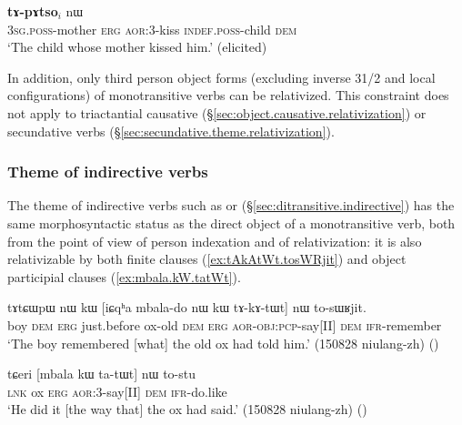 \begin{exe}
\ex \label{ex:Wmu.kW.kanWpoR}
\gll [ɯ$_i$-mu kɯ ka-nɯpoʁ] \textbf{tɤ-pɤtso}$_i$ nɯ \\
\textsc{3sg}.\textsc{poss}-mother \textsc{erg} \textsc{aor}:3\flobv{}-kiss \textsc{indef}.\textsc{poss}-child \textsc{dem} \\
\glt `The child whose mother kissed him.' (elicited)
\end{exe}

In addition, only third person object forms (excluding inverse 3\fl{}1/2 and local configurations) of monotransitive verbs can be relativized. This constraint does not apply to triactantial causative (§\ref{sec:object.causative.relativization}) or secundative verbs (§\ref{sec:secundative.theme.relativization}).
\subsubsection{Theme of indirective verbs} \label{sec:indirective.relativization}
The theme of indirective verbs such as  or  (§\ref{sec:ditransitive.indirective}) has the same morphosyntactic status as the direct object of a monotransitive verb, both from the point of view of person indexation and of relativization: it is also relativizable by both finite clauses (\ref{ex:tAkAtWt.tosWRjit}) and object participial clauses (\ref{ex:mbala.kW.tatWt}).

\begin{exe}
\ex \label{ex:tAkAtWt.tosWRjit}
\gll tɤtɕɯpɯ nɯ kɯ [iɕqʰa mbala-do nɯ kɯ tɤ-kɤ-tɯt] nɯ to-sɯʁjit. \\
boy \textsc{dem} \textsc{erg} just.before ox-old \textsc{dem} \textsc{erg} \textsc{aor}-\textsc{obj}:\textsc{pcp}-say[II] \textsc{dem} \textsc{ifr}-remember \\
 \glt `The boy remembered [what] the old ox had told him.' (150828 niulang-zh)
()
 \end{exe}
 
 \begin{exe}
\ex \label{ex:mbala.kW.tatWt}
\gll tɕeri [mbala kɯ ta-tɯt] nɯ to-stu \\
\textsc{lnk} ox \textsc{erg} \textsc{aor}:3\flobv{}-say[II] \textsc{dem} \textsc{ifr}-do.like \\
\glt `He did it [the way that] the ox had said.' (150828 niulang-zh)
()
\end{exe} 

